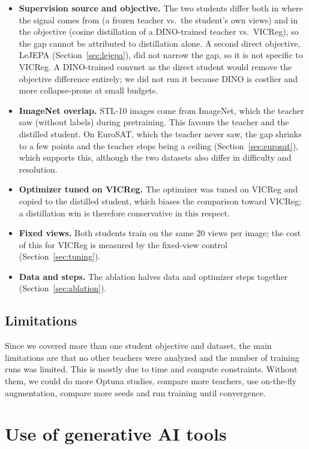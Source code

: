 \documentclass[letterpaper,11pt]{article}
\begin{document}
\begin{itemize}
  \item \textbf{Supervision source and objective.} The two students differ both in where the signal
    comes from (a frozen teacher vs.\ the student's own views) and in the objective (cosine
    distillation of a DINO-trained teacher vs.\ VICReg), so the gap cannot be attributed to
    distillation alone. A second direct objective, LeJEPA (Section~\ref{sec:lejepa}), did not
    narrow the gap, so it is not specific to VICReg. A DINO-trained convnet as the direct
    student would remove the objective difference entirely; we did not run it because DINO is
    costlier and more collapse-prone at small budgets.
  \item \textbf{ImageNet overlap.} STL-10 images come from ImageNet, which the teacher saw
    (without labels) during pretraining. This favours the teacher and the distilled student.
    On EuroSAT, which the teacher never saw, the gap shrinks to a few points and the teacher
    stops being a ceiling (Section~\ref{sec:eurosat}), which supports this, although the two
    datasets also differ in difficulty and resolution.
  \item \textbf{Optimizer tuned on VICReg.} The optimizer was tuned on VICReg and copied to
    the distilled student, which biases the comparison toward VICReg; a distillation win is
    therefore conservative in this respect.
  \item \textbf{Fixed views.} Both students train on the same 20 views per image; the cost of
    this for VICReg is measured by the fixed-view control (Section~\ref{sec:tuning}).
  \item \textbf{Data and steps.} The ablation halves data and optimizer steps together
    (Section~\ref{sec:ablation}).
\end{itemize}

\subsection{Limitations}
\label{sec:limitations}

Since we covered more than one student objective and dataset, the main limitations are that no other teachers were analyzed and the number of training runs was limited. This is mostly due to time and compute constraints. Without them, we could do more Optuna studies, compare more teachers, use on-the-fly augmentation, compare more seeds and run training until convergence.  

\section{Use of generative AI tools}
\label{sec:genai}
\end{document}
